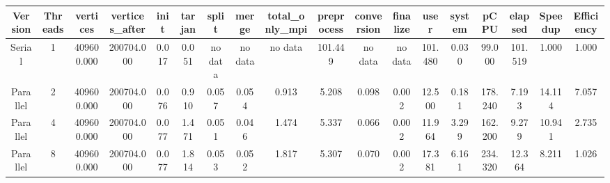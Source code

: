 \begin{tabular}{|c|c|c|c|c|c|c|c|c|c|c|c|c|c|c|c|c|c|}
\toprule
 Version &  Threads &   vertices &  vertices\_after &  init &  tarjan &   split &   merge & total\_only\_mpi &  preprocess & conversion & finalize &    user &  system &    pCPU &  elapsed &  Speedup &  Efficiency \\
\midrule
  Serial &        1 & 409600.000 &      200704.000 & 0.017 &   0.051 & no data & no data &        no data &     101.449 &    no data &  no data & 101.480 &   0.030 &  99.000 &  101.519 &    1.000 &       1.000 \\
Parallel &        2 & 409600.000 &      200704.000 & 0.076 &   0.910 &   0.057 &   0.054 &          0.913 &       5.208 &      0.098 &    0.002 &  12.500 &   0.181 & 178.240 &    7.193 &   14.114 &       7.057 \\
Parallel &        4 & 409600.000 &      200704.000 & 0.077 &   1.471 &   0.051 &   0.046 &          1.474 &       5.337 &      0.066 &    0.002 &  11.964 &   3.299 & 162.200 &    9.279 &   10.941 &       2.735 \\
Parallel &        8 & 409600.000 &      200704.000 & 0.077 &   1.814 &   0.053 &   0.052 &          1.817 &       5.307 &      0.070 &    0.002 &  17.381 &   6.161 & 234.320 &   12.364 &    8.211 &       1.026 \\
\bottomrule
\end{tabular}
